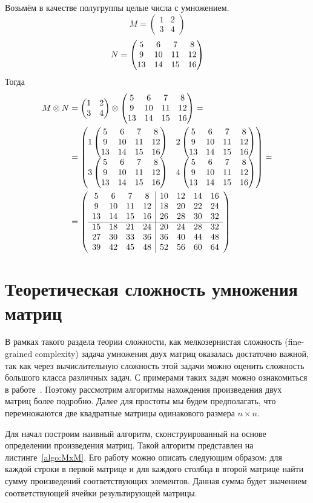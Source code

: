 \begin{example}
Возьмём в качестве полугруппы целые числа с умножением.
$$M=
\begin{pmatrix}
1 & 2 \\
3 & 4
\end{pmatrix}
$$
$$N=\begin{pmatrix} 5 & 6 & 7 & 8 \\ 9 & 10 & 11 & 12 \\ 13 & 14 & 15 & 16 \end{pmatrix}
$$
Тогда
\begin{align}
M \otimes N & =
\begin{pmatrix}
1 & 2 \\
3 & 4
\end{pmatrix}
\otimes
\begin{pmatrix} 5 & 6 & 7 & 8 \\ 9 & 10 & 11 & 12 \\ 13 & 14 & 15 & 16 \end{pmatrix} = \notag \\ &=
\begin{pmatrix}
1\begin{pmatrix} 5 & 6 & 7 & 8 \\ 9 & 10 & 11 & 12 \\ 13 & 14 & 15 & 16 \end{pmatrix} & 2\begin{pmatrix} 5 & 6 & 7 & 8 \\ 9 & 10 & 11 & 12 \\ 13 & 14 & 15 & 16 \end{pmatrix} \\
3\begin{pmatrix} 5 & 6 & 7 & 8 \\ 9 & 10 & 11 & 12 \\ 13 & 14 & 15 & 16 \end{pmatrix} & 4\begin{pmatrix} 5 & 6 & 7 & 8 \\ 9 & 10 & 11 & 12 \\ 13 & 14 & 15 & 16 \end{pmatrix}
\end{pmatrix}
=\notag \\
&=
\left(\begin{array}{c c c c | c c c c}
5  & 6  & 7  & 8  & 10 & 12 & 14 & 16 \\
9  & 10 & 11 & 12 & 18 & 20 & 22 & 24 \\
13 & 14 & 15 & 16 & 26 & 28 & 30 & 32 \\
\hline
15 & 18 & 21 & 24 & 20 & 24 & 28 & 32 \\
27 & 30 & 33 & 36 & 36 & 40 & 44 & 48 \\
39 & 42 & 45 & 48 & 52 & 56 & 60 & 64
\end{array}\right)
\end{align}
\end{example}


\section{Теоретическая сложность умножения матриц}

В рамках такого раздела теории сложности, как мелкозернистая сложность (fine-grained complexity) задача умножения двух матриц оказалась достаточно важной, так как через вычислительную сложность этой задачи можно оценить сложность большого класса различных задач. С примерами таких задач можно ознакомиться в работе~\cite{Williams:2010:SEP:1917827.1918339}. Поэтому рассмотрим алгоритмы нахождения произведения двух матриц более подробно. Далее для простоты мы будем предполагать, что перемножаются две квадратные матрицы одинакового размера $n \times n$.

Для начал построим наивный алгоритм, сконструированный на основе определении произведения матриц. Такой алгоритм представлен на листинге~\ref{algo:MxM}. Его работу можно описать следующим образом: для каждой строки в первой матрице и для каждого столбца в второй матрице найти сумму произведений соответствующих элементов. Данная сумма будет значением соответствующей ячейки результирующей матрицы.

